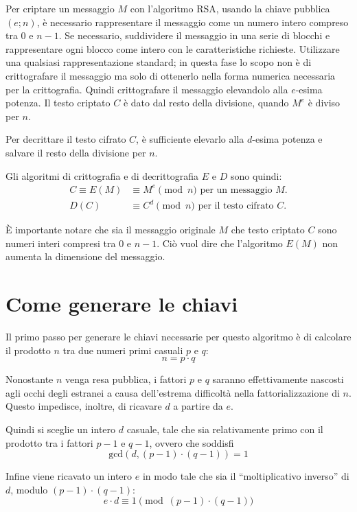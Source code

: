 Per criptare un messaggio $M$ con l'algoritmo RSA, usando la chiave pubblica $(e; n)$, è necessario rappresentare il messaggio come un numero intero compreso tra $0$ e $n-1$. Se necessario, suddividere il messaggio in una serie di blocchi e rappresentare ogni blocco come intero con le caratteristiche richieste. Utilizzare una qualsiasi rappresentazione standard; in questa fase lo scopo non è di crittografare il messaggio ma solo di ottenerlo nella forma numerica necessaria per la crittografia. Quindi crittografare il messaggio elevandolo alla $e$-esima potenza. Il testo criptato $C$ è dato dal resto della divisione, quando $M^e$ è diviso per $n$.

Per decrittare il testo cifrato $C$, è sufficiente elevarlo alla $d$-esima potenza e salvare il resto della divisione per $n$.

Gli algoritmi di crittografia e di decrittografia $E$ e $D$ sono quindi:
\begin{align*}
	C \equiv E(M) &\equiv M^e\pmod{n} \mbox{ per un messaggio }M. \\
	D(C) &\equiv C^d\pmod{n} \mbox{ per il testo cifrato }C. 
\end{align*}

È importante notare che sia il messaggio originale $M$ che testo criptato $C$ sono numeri interi compresi tra $0$ e $n-1$. Ciò vuol dire che l'algoritmo $E(M)$ non aumenta la dimensione del messaggio.

%
\section{Come generare le chiavi}

Il primo passo per generare le chiavi necessarie per questo algoritmo è di calcolare il prodotto $n$ tra due numeri primi casuali $p$ e $q$:
\[n=p\cdot q\]

Nonostante $n$ venga resa pubblica, i fattori $p$ e $q$ saranno effettivamente nascosti agli occhi degli estranei a causa dell'estrema difficoltà nella fattorializzazione di $n$. Questo impedisce, inoltre, di ricavare $d$ a partire da $e$.

Quindi si sceglie un intero $d$ casuale, tale che sia relativamente primo con il prodotto tra i fattori $p-1$ e $q-1$, ovvero che soddisfi
\[\mbox{gcd}\left(d, \left(p-1\right)\cdot\left(q-1\right)\right)=1\]

Infine viene ricavato un intero $e$ in modo tale che sia il ``moltiplicativo inverso'' di $d$, modulo $\left(p-1\right)\cdot\left(q-1\right)$:
\[ e \cdot d \equiv 1 \pmod{\left(p-1\right)\cdot\left(q-1\right)} \]

